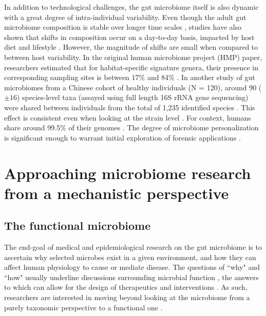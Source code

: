 In addition to technological challenges, the gut microbiome itself is also dynamic with a great degree of intra-individual variability. Even though the adult gut microbiome composition is stable over longer time scales \cite{consortium2012structure}, studies have also shown that shifts in composition occur on a day-to-day basis, impacted by host diet and lifestyle \cite{david2014host, david2014diet}. However, the magnitude of shifts are small when compared to between host variability. In the original human microbiome project (HMP) paper, researchers estimated that for habitat-specific signature genera, their presence in corresponding sampling sites is between 17\% and 84\% \cite{consortium2012structure}. In another study of gut microbiomes from a Chinese cohort of healthy individuals (N = 120), around 90 ($\pm 16$) species-level taxa (assayed using full length 16S rRNA gene sequencing) were shared between individuals from the total of 1,235 identified species \cite{yang2020specieslevel}. This effect is consistent even when looking at the strain level \cite{lloyd-price2017strains}. For context, humans share around 99.5\% of their genomes \cite{genetics}. The degree of microbiome personalization is significant enough to warrant initial exploration of forensic applications \cite{fierer2010forensic}. 


\section{Approaching microbiome research from a mechanistic perspective}

\subsection{The functional microbiome}

The end-goal of medical and epidemiological research on the gut microbiome is to ascertain why selected microbes exist in a given environment, and how they can affect human physiology to cause or mediate disease. The questions of ``why" and ``how" usually underline discussions surrounding microbial function \cite{klassen2018defining}, the answers to which can allow for the design of therapeutics and interventions \cite{durack2019gut}. As such, researchers are interested in moving beyond looking at the microbiome from a purely taxonomic perspective to a functional one \cite{heintz-buschart2018human}.  

